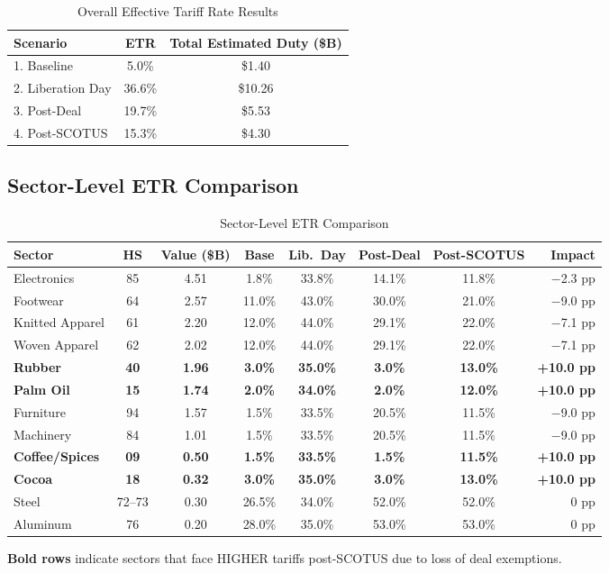 \documentclass[12pt,a4paper]{article}
\begin{document}
\begin{table}[htbp]
\centering
\caption{Overall Effective Tariff Rate Results}
\begin{tabular}{lcc}
\toprule
\textbf{Scenario} & \textbf{ETR} & \textbf{Total Estimated Duty (\$B)} \\
\midrule
1. Baseline & 5.0\% & \$1.40 \\
2. Liberation Day & 36.6\% & \$10.26 \\
3. Post-Deal & 19.7\% & \$5.53 \\
4. Post-SCOTUS & 15.3\% & \$4.30 \\
\bottomrule
\end{tabular}
\end{table}

\subsection{Sector-Level ETR Comparison}

\begin{table}[htbp]
\centering
\caption{Sector-Level ETR Comparison}
\small
\begin{tabular}{lccccccr}
\toprule
\textbf{Sector} & \textbf{HS} & \textbf{Value (\$B)} & \textbf{Base} & \textbf{Lib.\ Day} & \textbf{Post-Deal} & \textbf{Post-SCOTUS} & \textbf{Impact} \\
\midrule
Electronics & 85 & 4.51 & 1.8\% & 33.8\% & 14.1\% & 11.8\% & $-$2.3 pp \\
Footwear & 64 & 2.57 & 11.0\% & 43.0\% & 30.0\% & 21.0\% & $-$9.0 pp \\
Knitted Apparel & 61 & 2.20 & 12.0\% & 44.0\% & 29.1\% & 22.0\% & $-$7.1 pp \\
Woven Apparel & 62 & 2.02 & 12.0\% & 44.0\% & 29.1\% & 22.0\% & $-$7.1 pp \\
\textbf{Rubber} & \textbf{40} & \textbf{1.96} & \textbf{3.0\%} & \textbf{35.0\%} & \textbf{3.0\%} & \textbf{13.0\%} & \textbf{+10.0 pp} \\
\textbf{Palm Oil} & \textbf{15} & \textbf{1.74} & \textbf{2.0\%} & \textbf{34.0\%} & \textbf{2.0\%} & \textbf{12.0\%} & \textbf{+10.0 pp} \\
Furniture & 94 & 1.57 & 1.5\% & 33.5\% & 20.5\% & 11.5\% & $-$9.0 pp \\
Machinery & 84 & 1.01 & 1.5\% & 33.5\% & 20.5\% & 11.5\% & $-$9.0 pp \\
\textbf{Coffee/Spices} & \textbf{09} & \textbf{0.50} & \textbf{1.5\%} & \textbf{33.5\%} & \textbf{1.5\%} & \textbf{11.5\%} & \textbf{+10.0 pp} \\
\textbf{Cocoa} & \textbf{18} & \textbf{0.32} & \textbf{3.0\%} & \textbf{35.0\%} & \textbf{3.0\%} & \textbf{13.0\%} & \textbf{+10.0 pp} \\
Steel & 72--73 & 0.30 & 26.5\% & 34.0\% & 52.0\% & 52.0\% & 0 pp \\
Aluminum & 76 & 0.20 & 28.0\% & 35.0\% & 53.0\% & 53.0\% & 0 pp \\
\bottomrule
\end{tabular}
\par\smallskip
\footnotesize\textbf{Bold rows} indicate sectors that face HIGHER tariffs post-SCOTUS due to loss of deal exemptions.
\end{table}
\end{document}

